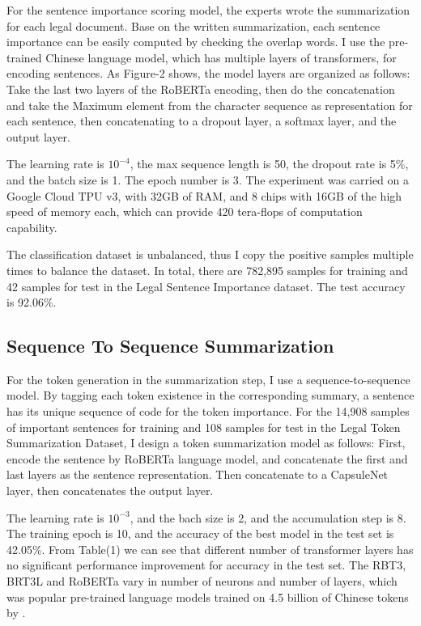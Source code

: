 \documentclass[11pt,a4paper]{article}
\begin{document}
For the sentence importance scoring model, the experts wrote the summarization for each legal document.
Base on the written summarization, each sentence importance can be easily computed by checking the overlap words.
I use the pre-trained Chinese language model, which has multiple layers of transformers,
for encoding sentences.
As Figure-2 shows, the model layers are organized as follows:
Take the last two layers of the RoBERTa encoding, then do the concatenation and take the Maximum element from the character
sequence as representation for each sentence, then concatenating to a dropout layer, a softmax layer,
and the output layer.

The learning rate is $10^{-4}$, the max sequence length is 50, the dropout rate is 5\%, and the batch size is 1.
The epoch number is 3. The experiment was carried on a Google Cloud TPU v3, with 32GB of RAM, and 8 chips with 16GB of the high speed of memory each,
which can provide 420 tera-flops of computation capability.

The classification dataset is unbalanced, thus I copy the positive samples multiple times to balance the dataset.
In total, there are 782,895 samples for training and 42 samples for test in the Legal Sentence Importance dataset.
The test accuracy is 92.06\%.

\subsection{Sequence To Sequence Summarization}

For the token generation in the summarization step, I use a sequence-to-sequence model.
By tagging each token existence in the corresponding summary, a sentence has its unique sequence of code for the token importance.
For the 14,908 samples of important sentences for training and 108 samples for test in the Legal Token Summarization Dataset, I design a token summarization model as follows:
First, encode the sentence by RoBERTa language model, and concatenate the first and last layers as the sentence representation.
Then concatenate to a CapsuleNet layer, then concatenates the output layer.

The learning rate is $10^{-3}$, and the bach size is 2, and the accumulation step is 8.
The training epoch is 10, and the accuracy of the best model in the test set is 42.05\%.
From Table(1) we can see that different number of transformer layers has no significant performance improvement for accuracy in the test set.
The RBT3, BRT3L and RoBERTa vary in number of neurons and number of layers,
which was popular pre-trained language models trained on 4.5 billion of Chinese tokens by \citet{cui2020revisiting}.
\end{document}
